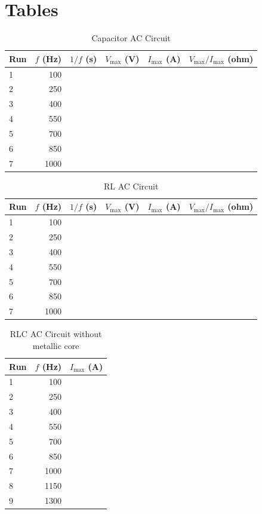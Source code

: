 \section{Tables}
%
\begin{table}[ht]
	\begin{center}
		\begin{tabular}{|l|r|r|r|r|r|}\hline
			Run & $f$ (Hz) & $1/f$ (s) & $V_{\text{max}}$ (V) & $I_{\text{max}}$ (A) & $V_{\text{max}}/I_{\text{max}}$ (ohm) \\
			\hline
			1 & 100 & & & & \\
			2 & 250 & & & & \\
			3 & 400 & & & & \\
			4 & 550 & & & & \\
			5 & 700 & & & & \\
			6 & 850 & & & & \\
			7 & 1000 & & & & \\
			\hline
		\end{tabular}
	\end{center}
	\caption{Capacitor AC Circuit}
	\label{table.capacitor.student}
\end{table}
%
\begin{table}[ht]
	\begin{center}
		\begin{tabular}{|l|r|r|r|r|r|}\hline
			Run & $f$ (Hz) & $1/f$ (s) & $V_{\text{max}}$ (V) & $I_{\text{max}}$ (A) & $V_{\text{max}}/I_{\text{max}}$ (ohm) \\
			\hline
			1 & 100 & & & & \\
			2 & 250 & & & & \\
			3 & 400 & & & & \\
			4 & 550 & & & & \\
			5 & 700 & & & & \\
			6 & 850 & & & & \\
			7 & 1000 & & & & \\
			\hline
		\end{tabular}
	\end{center}
	\caption{RL AC Circuit}
	\label{table.RL.student}
\end{table}
%
\begin{table}[ht]
	\begin{center}
		\begin{tabular}{|l|r|r|}\hline
			Run & $f$ (Hz) & $I_{\text{max}}$ (A) \\
			\hline
			1 & 100 & \\
			2 & 250 & \\
			3 & 400 & \\
			4 & 550 & \\
			5 & 700 & \\
			6 & 850 & \\
			7 & 1000 & \\
			8 & 1150 & \\
			9 & 1300 & \\
			\hline
		\end{tabular}
	\end{center}
	\caption{RLC AC Circuit without metallic core}
	\label{table.RLC.student}
\end{table}
